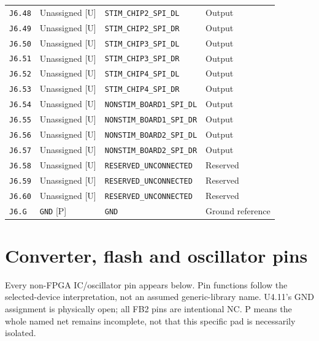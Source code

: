 \documentclass[11pt,a4paper]{article}
\begin{document}
\begin{longtable}{@{}P{21mm}P{34mm}P{78mm}P{33mm}@{}}
\nolinkurl{J6.48} & Unassigned [U] & \nolinkurl{STIM_CHIP2_SPI_DL} & Output \\
\nolinkurl{J6.49} & Unassigned [U] & \nolinkurl{STIM_CHIP2_SPI_DR} & Output \\
\nolinkurl{J6.50} & Unassigned [U] & \nolinkurl{STIM_CHIP3_SPI_DL} & Output \\
\nolinkurl{J6.51} & Unassigned [U] & \nolinkurl{STIM_CHIP3_SPI_DR} & Output \\
\nolinkurl{J6.52} & Unassigned [U] & \nolinkurl{STIM_CHIP4_SPI_DL} & Output \\
\nolinkurl{J6.53} & Unassigned [U] & \nolinkurl{STIM_CHIP4_SPI_DR} & Output \\
\nolinkurl{J6.54} & Unassigned [U] & \nolinkurl{NONSTIM_BOARD1_SPI_DL} & Output \\
\nolinkurl{J6.55} & Unassigned [U] & \nolinkurl{NONSTIM_BOARD1_SPI_DR} & Output \\
\nolinkurl{J6.56} & Unassigned [U] & \nolinkurl{NONSTIM_BOARD2_SPI_DL} & Output \\
\nolinkurl{J6.57} & Unassigned [U] & \nolinkurl{NONSTIM_BOARD2_SPI_DR} & Output \\
\nolinkurl{J6.58} & Unassigned [U] & \nolinkurl{RESERVED_UNCONNECTED} & Reserved \\
\nolinkurl{J6.59} & Unassigned [U] & \nolinkurl{RESERVED_UNCONNECTED} & Reserved \\
\nolinkurl{J6.60} & Unassigned [U] & \nolinkurl{RESERVED_UNCONNECTED} & Reserved \\
\nolinkurl{J6.G} & \nolinkurl{GND} [P] & \nolinkurl{GND} & Ground reference \\
\end{longtable}\endgroup

\clearpage\section{Converter, flash and oscillator pins}
Every non-FPGA IC/oscillator pin appears below. Pin functions follow the selected-device interpretation, not an assumed generic-library name. U4.11's GND assignment is physically open; all FB2 pins are intentional NC. P means the whole named net remains incomplete, not that this specific pad is necessarily isolated.
\end{document}
